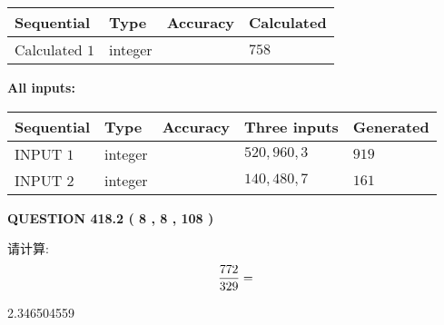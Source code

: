 \documentclass{ctexart}
\begin{document}
   
   
   
\noindent{}
   
   
  
  
\noindent\begin{tabular}{|l|l|l|l|}
\hline
 Sequential & Type & Accuracy & Calculated \\ 
\hline
 
 
  Calculated $  1 $ & integer &  & 
  $ 758 $ 
 \\  \hline  
 \end{tabular}
   
   
   
   
\noindent\vspace{0.1in}\hspace{-0.08in} {\textbf{\Large{All inputs: }}}
   
   
  
  
\noindent\begin{tabular}{|l|l|l|l|l|}
\hline
 Sequential & Type & Accuracy & Three inputs & Generated \\ 
\hline
 
 
  INPUT $  1 $ & integer &  & $
 520
 , 
 960
 , 
 3
 $ & $ 919 $ 
 \\  \hline  
 
 
  INPUT $  2 $ & integer &  & $
 140
 , 
 480
 , 
 7
 $ & $ 161 $ 
 \\  \hline  
 \end{tabular}
   
   
  
\vspace{0.2in}
  
{\textbf{\Large{QUESTION
418.2 
 ( 8 , 8 , 108 )
}}}
  
  
 
请计算:
\begin{equation}
\frac { %
772 }  {  %
329} = \nonumber
\end{equation}
 
 
 
\noindent{}
 
 

2.346504559
 
 
\noindent{}
 
 

 
 
 
\noindent{}
 
\end{document}

